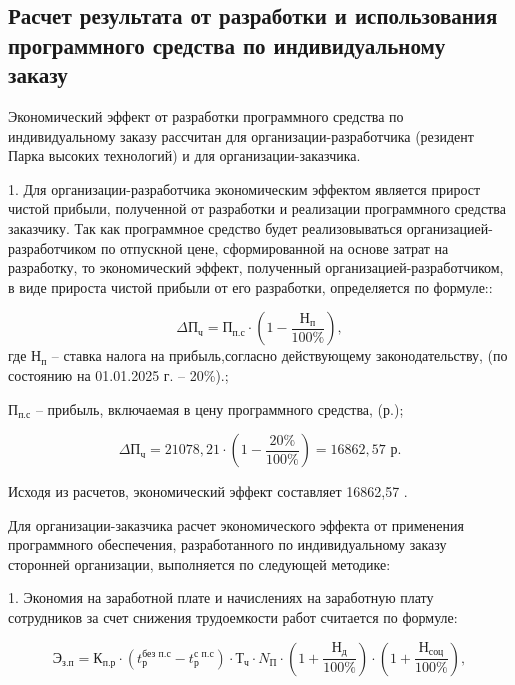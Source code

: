 \subsection{Расчет результата от разработки и использования программного средства по индивидуальному заказу}

Экономический эффект от разработки программного средства по индивидуальному заказу рассчитан для организации-разработчика (резидент Парка высоких технологий) и для организации-заказчика.

1. Для организации-разработчика экономическим эффектом является прирост чистой прибыли, полученной от разработки и реализации программного средства заказчику. Так как программное средство будет реализовываться организацией-разработчиком по отпускной цене, сформированной на основе затрат на разработку, то экономический эффект, полученный организацией-разработчиком, в виде прироста чистой прибыли от его разработки, определяется по формуле::

\begin{equation}
\text{$\Delta$П}_{\text{ч}} = \text{П}_{\text{п.с}} \cdot (1 - \frac{\text{Н}_{\text{п}} }{100\%}),
\end{equation}
где $\text{Н}_{\text{п}}$ -- ставка налога на прибыль,согласно действующему законодательству, (по состоянию на 01.01.2025 г. – 	20\%).;

$\text{П}_{\text{п.с}}$ -- прибыль, включаемая в цену программного средства, (р.);

$$
	\text{$\Delta$П}_{\text{ч}} = 21078,21 \cdot (1 - \frac{20\%}{100\%}) = 16862,57 \text{ р}.
$$

Исходя из расчетов, экономический эффект составляет 16862,57 .


Для организации-заказчика расчет экономического эффекта от применения программного обеспечения, разработанного по индивидуальному заказу сторонней организации, выполняется по следующей методике:

1. Экономия на заработной плате и начислениях на заработную плату сотрудников за счет снижения трудоемкости работ считается по формуле:


\begin{equation}
\text{Э}_{\text{з.п}} = \text{К}_{\text{п.р}}\cdot (t^{\text{без п.с}}_{\text{р}}-t^{\text{с п.с}}_{\text{р}})\cdot \text{Т}_{\text{ч}}\cdot N_{\text{П}}\cdot  (1+\frac{\text{Н}_{\text{д}}}{100\%})\cdot (1+\frac{\text{Н}_{\text{соц}}}{100\%}),
\end{equation}

